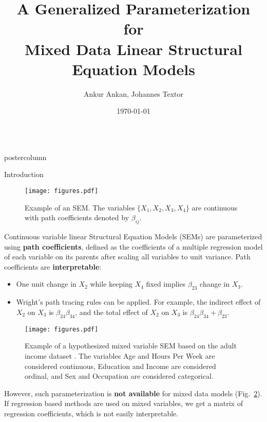 \documentclass{beamer}
\title{\huge A Generalized Parameterization for \\ Mixed Data Linear Structural Equation Models}
\author{Ankur Ankan, Johannes Textor}
\institute[RU]{Institute for Computing and Information Sciences \\ Radboud University, Netherlands}
\date{\today}
\newlength{\columnheight}
\begin{document}
\begin{frame}
\begin{columns}
	\begin{column}{.33\textwidth}
		\begin{beamercolorbox}[center]{postercolumn}
			\begin{minipage}{.98\textwidth}  %
				\parbox[t][\columnheight]{\textwidth}{ %
	\begin{myblock}{Introduction}
		\begin{figure}
			\texttt{[image: figures.pdf]}
			\caption{Example of an SEM. The variables $ \{ X_1, X_2, X_3, X_4 \} $ are continuous with path coefficients denoted by $ \beta_{ij} $.}
			\label{fig:example_sem}
		\end{figure}

		\vspace{1em}
		
		Continuous variable linear Structural Equation Models (SEMs)
		are parameterized using \textbf{path coefficients}, defined as
		the coefficients of a multiple regression model of each
		variable on its parents after scaling all variables to unit
		variance. Path coefficients are \textbf{interpretable}:
		\begin{itemize}
			\item One unit change in $ X_2 $ while keeping $ X_4 $ fixed implies $ \beta_{23} $ change in $ X_3 $. 
			\item Wright's path tracing rules \citep{Wright1934}
				can be applied. For example, the indirect
				effect of $ X_2 $ on $ X_3 $ is $ \beta_{24}
				\beta_{34} $, and the total effect of $ X_2 $ on
				$ X_3 $ is $ \beta_{24} \beta_{34} + \beta_{23}
				$.
		\end{itemize}

		\begin{figure}
			\texttt{[image: figures.pdf]}
			\caption{Example of a hypothesized mixed variable SEM
				based on the adult income dataset
				\citep{kohavi1996}. The variables Age and Hours
				Per Week are considered continuous, Education
				and Income are considered ordinal, and Sex and
				Occupation are considered categorical.}
			\label{fig:example_adult}
		\end{figure}

		\vspace{1em}

		However, such parameterization is \textbf{not available} for
		mixed data models (Fig.~\ref{fig:example_adult}). If regression
		based methods are used on mixed variables, we get a matrix of
		regression coefficients, which is not easily interpretable.


\end{myblock}}
\end{minipage}
\end{beamercolorbox}
\end{column}
\end{columns}
\end{frame}
\end{document}
